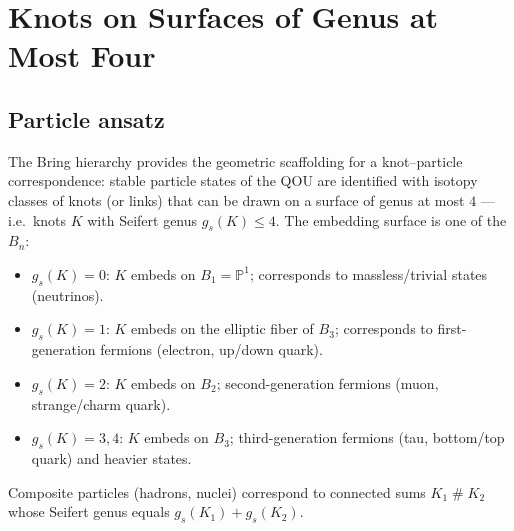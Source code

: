 



\section{Knots on Surfaces of Genus at Most Four}
\label{sec:knots-genus-leq-4}

\subsection{Particle ansatz}
\label{subsec:particle-ansatz}

\begin{remark}
\label{rem:knot-particle-correspondence}
The Bring hierarchy provides the geometric scaffolding for a knot--particle
correspondence: stable particle states of the QOU are identified with
isotopy classes of knots (or links) that can be drawn on a surface of
genus at most $4$ --- i.e.\ knots $K$ with Seifert genus
$g_s(K) \le 4$.  The embedding surface is one of the $B_n$:
\begin{itemize}
  \item $g_s(K)=0$: $K$ embeds on $B_1 = \mathbb{P}^1$; corresponds to
        massless/trivial states (neutrinos).
  \item $g_s(K)=1$: $K$ embeds on the elliptic fiber of $B_3$;
        corresponds to first-generation fermions (electron, up/down
        quark).
  \item $g_s(K)=2$: $K$ embeds on $B_2$; second-generation
        fermions (muon, strange/charm quark).
  \item $g_s(K)=3,4$: $K$ embeds on $B_3$; third-generation
        fermions (tau, bottom/top quark) and heavier states.
\end{itemize}
Composite particles (hadrons, nuclei) correspond to connected sums
$K_1 \mathbin{\#} K_2$ whose Seifert genus equals $g_s(K_1)+g_s(K_2)$.
\end{remark}

